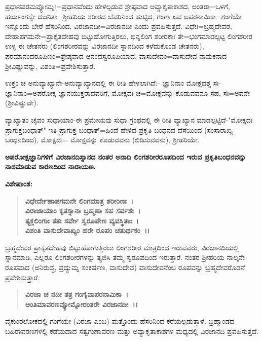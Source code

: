 ಪ್ರಧಾನಪರಮವ್ಯೋಮ್ನಃ=ಪ್ರಧಾನವೆಂದು ಹೇಳಲ್ಪಡುವ ಶ್ರೇಷ್ಠವಾದ ಅವ್ಯಾಕೃತಾಕಾಶದ, ಅಂತರಾ=ಒಳಗೆ, ಹರ್ಯಂಗಸ್ವೇ ದಜನಿತಾ=ಶ‍್ರೀಹರಿಯ ಶರೀರದ ಬೆವರಿನಿಂದ ಹುಟ್ಟಿದ, ಗಂಗಾ ಏವ ಅಪರನಾಮಿಕಾ=ಗಂಗೆಯೇ ಇನ್ನೊಂದು ಬೇರೆ ಹೆಸರಿನಿಂದ, ವಿರಜಾನದೀ=ವಿರಜಾನದೀ ಎಂದು ಪ್ರವಹಿಸುತ್ತದೆ. ವಿಧೇಃ=ಬ್ರಹ್ಮದೇವರ, ದೇಹಾಪಗಮನೇ=\-ಪ್ರಾಕೃತದೇಹವು ಬಿಟ್ಟುಹೋಗುತ್ತಿರಲು, ಭಿನ್ನಲಿಂಗ ಶರೀರಕಾಃ ತೇ=ಭಂಗಮಾಡಲ್ಪಟ್ಟ ಲಿಂಗಶರೀರ ಉಳ್ಳ ಈ ಚೇತನರು (ಲಿಂಗಶರೀರವನ್ನು ವಿರಜಾನದೀ ಸ್ನಾನದಿಂದ ಕಳೆದುಕೊಂಡ ಚೇತನರು), ಪರಮಾನಂದರೂಪಿಣಂ=ಶ್ರೇಷ್ಠವಾದ ಆನಂದಸ್ವರೂಪಿಯಾದ, ವಾಸುದೇವಂ=\-ವಾಸುದೇವ ನಾಮಕನಾದ ಶ‍್ರೀವಿಷ್ಣುವನ್ನು, ವಿಶಂತಿ=ಪ್ರವೇಶಿಸುತ್ತಾರೆ.

ಉಕ್ತಂ ಚ ಅನುವ್ಯಾಖ್ಯಾನೇ-ಅನುವ್ಯಾಖ್ಯಾನದಲ್ಲಿ ಈ ರೀತಿ ಹೇಳಲಾಗಿದೆ:- ಜ್ಞಾನಿನಾಂ ಮೋಕ್ಷದಶ್ಚ ಸಃ- ಜ್ಞಾನಿನಾಂ=ಅಪರೋಕ್ಷ ಜ್ಞಾನಯುಕ್ತರಾದವರಿಗೆ, ಮೋಕ್ಷದಃ ಚ=ಮೋಕ್ಷವನ್ನು ಕೊಡುವವನೂ ಸಹ, ಸಃ=ಅವನೇ (ಶ‍್ರೀವಿಷ್ಣುವೇ).

ವ್ಯಾಖ್ಯಾತಂ ಚೈವಂ ಸುಧಾಯಾಂ-ಈ ಪ್ರಮೇಯವು ಸುಧಾ ಗ್ರಂಥದಲ್ಲಿ ಈ ರೀತಿ ವ್ಯಾಖ್ಯಾನ ಮಾಡಲ್ಪಟ್ಟಿದೆ-"ಮೋಕ್ಷದಃ ಪ್ರಾಗುಕ್ತಬಂಧಾತ್" ಇತಿ-ಪ್ರಾಗುಕ್ತ ಬಂಧಾತ್=ಹಿಂದೆ ಹೇಳಿದ ಪ್ರಕೃತಿ ಬಂಧನದ ದೆಸೆಯಿಂದ (ಸಂಸಾರಾಖ್ಯ ಬಂಧನದಿಂದ), ಮೋಕ್ಷದಃ= ಮೋಕ್ಷವನ್ನು ಕೊಡುವವನು (ಬಿಡಿಸುವವನು), ಶ‍್ರೀಹರಿಯೇ.

\begin{center}
\textbf{ಅಪರೋಕ್ಷಜ್ಞಾನಿಗಳಿಗೆ ವಿರಜಾನದಿಸ್ನಾನದ ನಂತರ ಅನಾದಿ ಲಿಂಗಶರೀರರೂಪದಿಂದ ಇರುವ ಪ್ರಕೃತಿಬಂಧನವನ್ನು ನಾಶಮಾಡುವ ಕಾರಣದಿಂದ ನಾರಾಯಣ.}
\end{center}

\noindent
\textbf{ವಿಶೇಷಾಂಶ:\enginline{-}}

\begin{verse}
\textbf{ವಿಧೇರ್ದೇಹಾಪಗಮನೇ ಲಿಂಗಮಾತ್ರ ಶರೀರಿಣಃ~।}\\\textbf{ವಿರಾಜಾಯಾಂ ಕೃತಸ್ನಾನಾ ಬ್ರಹ್ಮಣಾ ಸಹ ಸರ್ವಶಃ~।}\\\textbf{ತ್ಯಕ್ತಲಿಂಗಾಃ ತತಃ ಸರ್ವೇ ಸ್ವರೂಪೇಣ ವ್ಯವಸ್ಥಿತಾಃ~।}\\\textbf{ವಿಶಂತಿ ವಾಸುದೇವಾಖ್ಯಂ ಹರೇ ರೂಪಂ ಚತುರ್ಥಕಂ~।।}
\end{verse}


ಬ್ರಹ್ಮದೇವರ ಪ್ರಾಕೃತದೇಹವು ಬಿಟ್ಟುಹೋಗುತ್ತಿರಲು ಲಿಂಗಶರೀರ ಮಾತ್ರದಿಂದ ಇರುವವರು, ವಿರಜಾನದಿಯಲ್ಲಿ ಸ್ನಾನಮಾಡಿ, ಎಲ್ಲರೂ ಲಿಂಗಶರೀರಗಳನ್ನು ತ್ಯಜಿಸಿ ತಮ್ಮ ಸ್ವರೂಪ\-ದಿಂದ ಇರುತ್ತಾರೆ. ನಂತರ ಶ‍್ರೀಹರಿಯ ನಾಲ್ಕನೇ ರೂಪವಾದ (ಅನಿರುದ್ಧ, ಪ್ರದ್ಯುಮ್ನ ಸಂಕರ್ಷಣ, ವಾಸುದೇವ) ವಾಸುದೇವನೆಂಬ ರೂಪವನ್ನು ಬ್ರಹ್ಮದೇವರೊಡನೆ ಪ್ರವೇಶಿಸುತ್ತಾರೆ.

\begin{verse}
\textbf{ವಿರಜಾ ಚ ನದೀ ತತ್ರ ಗಂಗೈವಾಪರನಾಮಿಕಾ~।}\\\textbf{ಅಂತಿಮಾವರಣವ್ಯೋಮ್ನೋರಂತರೇ ವಿರಜಾನದೀ~।।}
\end{verse}


ವೈಕುಂಠಲೋಕದಲ್ಲಿ ಗಂಗೆಯೇ (ವಿರಜಾ ಎಂಬ) ಮತ್ತೊಂದು ಹೆಸರಿನಿಂದ ಕರೆಯಲ್ಪಡು\-ತ್ತಾಳೆ. ಬ್ರಹ್ಮಾಂಡದ ಬಹಿರಾವರಣಗಳಲ್ಲಿ ಕಡೆಯದಾದ ಸತ್ವಗುಣಾವರಣ ಮತ್ತು ಅವ್ಯಾಕೃತಾಕಾಶಗಳ ಮಧ್ಯದಲ್ಲಿ ವಿರಜಾನದಿ ಪ್ರವಹಿಸುತ್ತದೆ.

